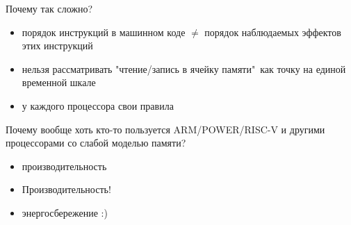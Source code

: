 \begin{frame}[t,noframenumbering]{Почему так сложно?}
 
 \begin{itemize}
  \item порядок инструкций в машинном коде $\neq$ порядок наблюдаемых эффектов этих инструкций 
  \item нельзя рассматривать "чтение/запись в ячейку памяти"\ как точку на единой временной шкале
  \item у каждого процессора свои правила
 \end{itemize}
 
 Почему вообще хоть кто-то пользуется ARM/POWER/RISC-V и другими процессорами со слабой моделью памяти? 
 \pause
 \begin{itemize}
   \item производительность
   \pause
   \item Производительность!
   \pause
   \item энергосбережение :)
 \end{itemize}
 
 \end{frame}


% 
% 
% 
% 
% 
% 

